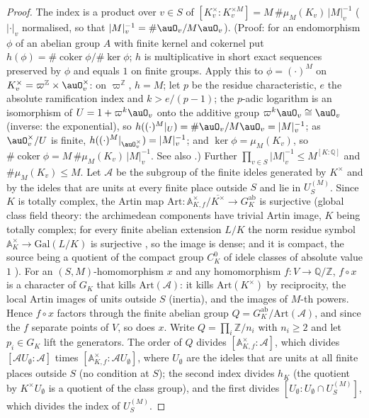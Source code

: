 \documentclass[10pt]{amsart}
\theoremstyle{definition}
\theoremstyle{remark}
\newcommand{\Z}{\mathbb Z}
\newcommand{\Q}{\mathbb Q}
\begin{document}
\begin{proof}
The index is a product over $v\in S$ of $[K_v^\times:K_v^{\times M}]=M\,\#\mu_M(K_v)\,|M|_v^{-1}$ ($|\cdot|_v$ normalised, so that
$|M|_v^{-1}=\#\auO_v/M\auO_v$). (Proof: for an endomorphism $\phi$ of an abelian group $A$ with finite kernel
and cokernel put $h(\phi)=\#\operatorname{coker}\phi/\#\ker\phi$; $h$ is multiplicative in short exact
sequences preserved by $\phi$ and equals $1$ on finite groups. Apply this to $\phi=(\cdot)^M$ on
$K_v^\times=\varpi^\Z\times\auO_v^\times$: on $\varpi^\Z$, $h=M$; let $p$ be the residue characteristic, $e$
the absolute ramification index and $k>e/(p-1)$; the $p$-adic logarithm is an isomorphism of
$U=1+\varpi^k\auO_v$ onto the additive group $\varpi^k\auO_v\cong\auO_v$ (inverse: the exponential), so
$h((\cdot)^M|_U)=\#\auO_v/M\auO_v=|M|_v^{-1}$; as $\auO_v^\times/U$ is finite,
$h((\cdot)^M|_{\auO_v^\times})=|M|_v^{-1}$; and $\ker\phi=\mu_M(K_v)$, so
$\#\operatorname{coker}\phi=M\,\#\mu_M(K_v)\,|M|_v^{-1}$. See also \cite[Chapter~II, Corollary~(5.8)]{Neukirch}.) Further $\prod_{v\in S}|M|_v^{-1}\le M^{[K:\Q]}$ and
$\#\mu_M(K_v)\le M$. Let $\mathcal A$ be the subgroup of the finite ideles generated by $K^\times$
and by the ideles that are units at every finite place outside $S$ and lie in $U_S^{(M)}$. Since $K$
is totally complex, the Artin map $\mathrm{Art}\colon\mathbb A_{K,f}^\times/\overline{K^\times}\to
G_K^{\mathrm{ab}}$ is surjective (global class field theory: the archimedean components have trivial Artin image, $K$
being totally complex; for every finite abelian extension $L/K$ the norm residue symbol $\mathbb A_K^\times\to
\mathrm{Gal}(L/K)$ is surjective \cite[Chapter~VI, Theorem~(5.5)]{Neukirch}, so the image is dense; and it
is compact, the source being a quotient of the compact group $C_K^0$ of idele classes of absolute value $1$
\cite[Chapter~VI, Theorem~(1.6)]{Neukirch}). For an $(S,M)$-homomorphism $x$ and any
homomorphism $f\colon V\to\Q/\Z$, $f\circ x$ is a character of $G_K$ that kills
$\mathrm{Art}(\mathcal A)$: it kills $\mathrm{Art}(K^\times)$ by reciprocity, the local Artin images
of units outside $S$ (inertia), and the images of $M$-th powers. Hence $f\circ x$ factors through
the finite abelian group $Q=G_K^{\mathrm{ab}}/\mathrm{Art}(\mathcal A)$, and since the $f$ separate
points of $V$, so does $x$. Write $Q=\prod_i\Z/n_i$ with $n_i\ge2$ and let $p_i\in G_K$ lift the
generators. The order of $Q$ divides $[\mathbb A^\times_{K,f}:\mathcal A]$, which divides
$[\mathcal AU_\emptyset:\mathcal A]$ times $[\mathbb A^\times_{K,f}:\mathcal AU_\emptyset]$, where
$U_\emptyset$ are the ideles that are units at all finite places outside $S$ (no condition at $S$);
the second index divides $h_K$ (the quotient by $K^\times U_\emptyset$ is a quotient of the class
group), and the first divides $[U_\emptyset:U_\emptyset\cap U_S^{(M)}]$, which divides the index of
$U_S^{(M)}$.
\end{proof}
\end{document}
